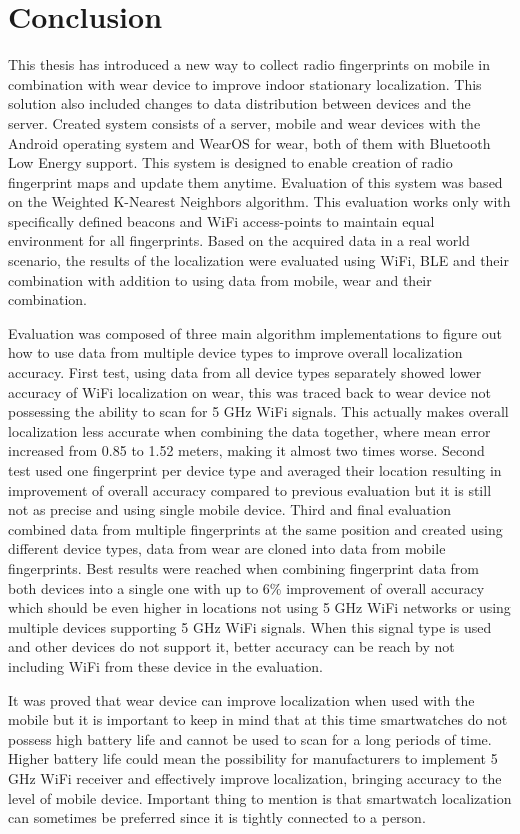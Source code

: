 \chapter{Conclusion}\label{sec:Conclusion}
This thesis has introduced a new way to collect radio fingerprints on mobile in combination with wear device to improve indoor stationary localization. This solution also included changes to data distribution between devices and the server. Created system consists of a server, mobile and wear devices with the Android operating system and WearOS for wear, both of them with Bluetooth Low Energy support. This system is designed to enable creation of radio fingerprint maps and update them anytime. Evaluation of this system was based on the Weighted K-Nearest Neighbors algorithm. This evaluation works only with specifically defined beacons and WiFi access-points to maintain equal environment for all fingerprints. Based on the acquired data in a real world scenario, the results of the localization were evaluated using WiFi, BLE and their combination with addition to using data from mobile, wear and their combination.

Evaluation was composed of three main algorithm implementations to figure out how to use data from multiple device types to improve overall localization accuracy. First test, using data from all device types separately showed lower accuracy of WiFi localization on wear, this was traced back to wear device not possessing the ability to scan for 5 GHz WiFi signals. This actually makes overall localization less accurate when combining the data together, where mean error increased from 0.85 to 1.52 meters, making it almost two times worse. Second test used one fingerprint per device type and averaged their location resulting in improvement of overall accuracy compared to previous evaluation but it is still not as precise and using single mobile device. Third and final evaluation combined data from multiple fingerprints at the same position and created using different device types, data from wear are cloned into data from mobile fingerprints. Best results were reached when combining fingerprint data from both devices into a single one with up to 6\% improvement of overall accuracy which should be even higher in locations not using 5 GHz WiFi networks or using multiple devices supporting 5 GHz WiFi signals. When this signal type is used and other devices do not support it, better accuracy can be reach by not including WiFi from these device in the evaluation.

It was proved that wear device can improve localization when used with the mobile but it is important to keep in mind that at this time smartwatches do not possess high battery life and cannot be used to scan for a long periods of time. Higher battery life could mean the possibility for manufacturers to implement 5 GHz WiFi receiver and effectively improve localization, bringing accuracy to the level of mobile device. Important thing to mention is that smartwatch localization can sometimes be preferred since it is tightly connected to a person.

